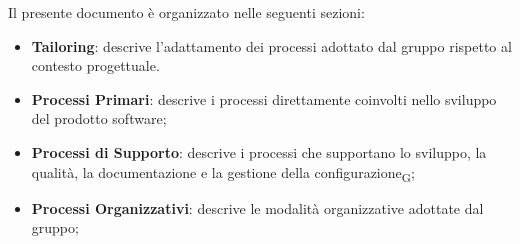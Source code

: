 Il presente documento è organizzato nelle seguenti sezioni:

\begin{itemize}
      \item \textbf{Tailoring}: descrive l'adattamento dei processi adottato dal gruppo rispetto al contesto progettuale.

      \item \textbf{Processi Primari}: descrive i processi direttamente coinvolti nello sviluppo del prodotto software;

      \item \textbf{Processi di Supporto}: descrive i processi che supportano lo sviluppo, la qualità, la documentazione e la gestione della configurazione\textsubscript{G};

      \item \textbf{Processi Organizzativi}: descrive le modalità organizzative adottate dal gruppo;
\end{itemize}